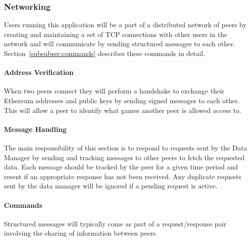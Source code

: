 \subsubsection{Networking}

Users running this application will be a part of a distributed network of peers by creating and maintaining a set of TCP connections with other users in the network and will communicate by sending structured messages to each other. Section~\ref{subsubsec:commands} describes these commands in detail.

\paragraph*{Address Verification}
When two peers connect they will perform a handshake to exchange their Ethereum addresses and public keys by sending signed messages to each other. This will allow a peer to identify what games another peer is allowed access to.

\paragraph*{Message Handling}

The main responsibility of this section is to respond to requests sent by the Data Manager by sending and tracking messages to other peers to fetch the requested data. Each message should be tracked by the peer for a given time period and resent if an appropriate response has not been received. Any duplicate requests sent by the data manager will be ignored if a pending request is active. 

\paragraph*{Commands}\label{subsubsec:commands}

Structured messages will typically come as part of a request/response pair involving the sharing of information between peers.

